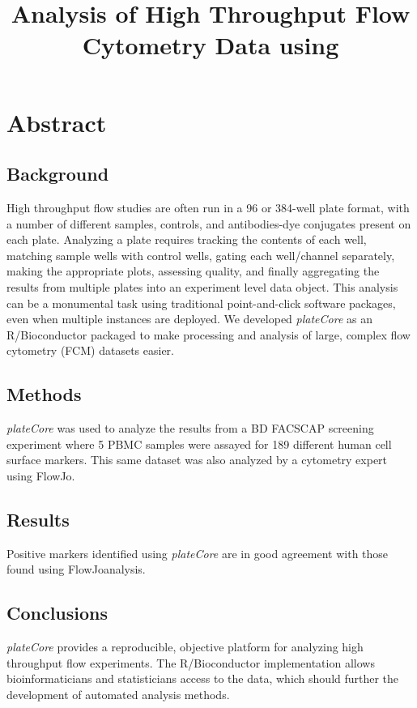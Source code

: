 \documentclass[12pt]{article}
\title{Analysis of High Throughput Flow Cytometry Data using \Rpackage{plateCore}}
\newcommand{\Rpackage}[1]{{\textit{#1}}}
\begin{document}
\maketitle

\clearpage
\section*{Abstract}
\subsection*{Background}
High throughput flow studies are often run in a 96 or 384-well plate format, with a number of different samples, 
controls, and antibodies-dye conjugates present on each plate. 
Analyzing a plate requires tracking the contents
of each well, matching sample wells with control wells, gating each well/channel separately, making the appropriate plots,
assessing quality, and finally aggregating the results from multiple plates into an experiment level data object. 
This analysis can be a monumental task using traditional point-and-click software packages, even when multiple instances are
deployed. We developed \Rpackage{plateCore} as an R/Bioconductor packaged to make processing and analysis of large, complex flow cytometry (FCM) datasets
easier. 

\subsection*{Methods}
\Rpackage{plateCore} was used to analyze the results from a BD FACS\texttrademark CAP screening experiment where 5 PBMC samples 
were assayed for 189 different human cell surface markers. 
This same dataset was also analyzed by a cytometry expert using FlowJo\texttrademark.

\subsection*{Results}
Positive markers identified using \Rpackage{plateCore} are in good agreement with those found using FlowJo\texttrademark analysis.

\subsection*{Conclusions}
\Rpackage{plateCore} provides a reproducible, objective platform for analyzing high throughput flow experiments. The R/Bioconductor 
implementation allows bioinformaticians and statisticians access to the data, which should further the development of automated
analysis methods.
\end{document}
